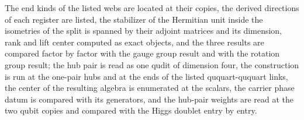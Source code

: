 The end kinds of the listed webs are located at their copies, the derived directions of each register are listed, the stabilizer of the Hermitian unit inside the isometries of the split is spanned by their adjoint matrices and its dimension, rank and lift center computed as exact objects, and the three results are compared factor by factor with the gauge group result and with the rotation group result; the hub pair is read as one qudit of dimension four, the construction is run at the one-pair hubs and at the ends of the listed ququart-ququart links, the center of the resulting algebra is enumerated at the scalars, the carrier phase datum is compared with its generators, and the hub-pair weights are read at the two qubit copies and compared with the Higgs doublet entry by entry.


